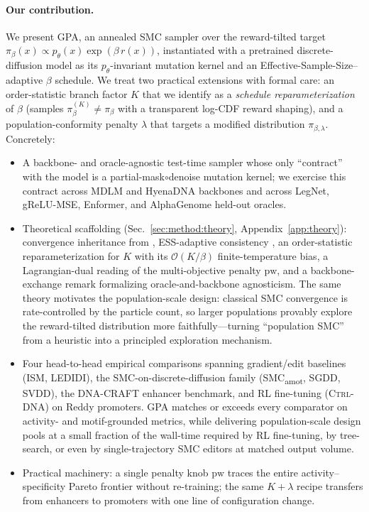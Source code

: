 \documentclass{article}
\theoremstyle{definition}
\theoremstyle{remark}
\newcommand{\gpa}{\textsc{GPA}\xspace}
\newcommand{\ctrldna}{\textsc{Ctrl-DNA}\xspace}
\newcommand{\svdd}{\textsc{SVDD}\xspace}
\newcommand{\ism}{\textsc{ISM}\xspace}
\newcommand{\ledidi}{\textsc{LEDIDI}\xspace}
\newcommand{\dnacraft}{\textsc{DNA-CRAFT}\xspace}
\newcommand{\smcamot}{\textsc{SMC}\textsubscript{amot}\xspace}
\newcommand{\sgdd}{\textsc{SGDD}\xspace}
\begin{document}
\paragraph{Our contribution.} We present \gpa{}, an annealed SMC sampler over the reward-tilted target $\pi_\beta(x)\propto p_\theta(x)\exp(\beta\,r(x))$, instantiated with a pretrained discrete-diffusion model as its $p_\theta$-invariant mutation kernel and an Effective-Sample-Size–adaptive $\beta$ schedule. We treat two practical extensions with formal care: an order-statistic branch factor $K$ that we identify as a \emph{schedule reparameterization} of $\beta$ (samples $\pi_\beta^{(K)}\!\neq\!\pi_\beta$ with a transparent log-CDF reward shaping), and a population-conformity penalty $\lambda$ that targets a modified distribution $\pi_{\beta,\lambda}$. Concretely:
\begin{itemize}
\item A backbone- and oracle-agnostic test-time sampler whose only ``contract'' with the model is a partial-mask$\circ$denoise mutation kernel; we exercise this contract across MDLM and HyenaDNA backbones and across LegNet, gReLU-MSE, Enformer, and AlphaGenome held-out oracles.
\item Theoretical scaffolding (Sec.~\ref{sec:method:theory}, Appendix~\ref{app:theory}): convergence inheritance from \citet{delmoral2006smc}, ESS-adaptive consistency \citep{delmoral2012adaptive}, an order-statistic reparameterization for $K$ with its $\mathcal{O}(K/\beta)$ finite-temperature bias, a Lagrangian-dual reading of the multi-objective penalty $\mathrm{pw}$, and a backbone-exchange remark formalizing oracle-and-backbone agnosticism. The same theory motivates the population-scale design: classical SMC convergence is rate-controlled by the particle count, so larger populations provably explore the reward-tilted distribution more faithfully---turning ``population SMC'' from a heuristic into a principled exploration mechanism.
\item Four head-to-head empirical comparisons spanning gradient/edit baselines (\ism, \ledidi), the SMC-on-discrete-diffusion family (\smcamot, \sgdd, \svdd), the \dnacraft{} enhancer benchmark, and RL fine-tuning (\ctrldna) on Reddy promoters. \gpa{} matches or exceeds every comparator on activity- and motif-grounded metrics, while delivering population-scale design pools at a small fraction of the wall-time required by RL fine-tuning, by tree-search, or even by single-trajectory SMC editors at matched output volume.
\item Practical machinery: a single penalty knob $\mathrm{pw}$ traces the entire activity--specificity Pareto frontier without re-training; the same $K\!+\!\lambda$ recipe transfers from enhancers to promoters with one line of configuration change.
\end{itemize}
\end{document}
